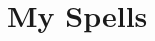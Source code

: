 \documentclass[fullpage, a4paper]{article}
\begin{document}

\center
\section*{My Spells}\smallskip
\flushleft



\end{document}
